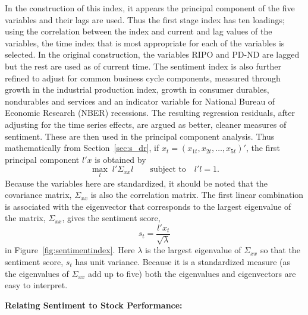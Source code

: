 In the construction of this index, it appears the principal component of the five variables and their lags are used. Thus the first stage index has ten loadings; using the correlation between the index and current and lag values of the variables, the time index that is most appropriate for each of the variables is selected. In the original construction, the variables RIPO and PD-ND are lagged but the rest are used as of current time. The sentiment index is also further refined to adjust for common business cycle components, measured through growth in the industrial production index, growth in consumer durables, nondurables and services and an indicator variable for National Bureau of Economic Research (NBER) recessions. The resulting regression residuals, after adjusting for the time series effects, are argued as better, cleaner measures of sentiment. These are then used in the principal component analysis. Thus mathematically from Section~\ref{sec:s_dr}, if $x_t= (x_{1t}, x_{2t}, \ldots, x_{5t})'$, the first principal component $l'x$ is obtained by
	\begin{equation}
	\max_l \; l' \textstyle \Sigma_{xx} l \qquad \text{subject to} \quad l'l=1.
	\end{equation}
Because the variables here are standardized, it should be noted that the covariance matrix, $\Sigma_{xx}$ is also the correlation matrix. The first linear combination is associated with the eigenvector that corresponds to the largest eigenvalue of the matrix, $\Sigma_{xx}$, gives the sentiment score,
	\begin{equation} \label{eq:stsqlambda}
	s_t= \dfrac{l' x_t}{\sqrt{\lambda}}
	\end{equation}
in Figure~\ref{fig:sentimentindex}. Here $\lambda$ is the largest eigenvalue of $\Sigma_{xx}$ so that the sentiment score, $s_t$ has unit variance. Because it is a standardized measure (as the eigenvalues of $\Sigma_{xx}$ add up to five) both the eigenvalues and eigenvectors are easy to interpret. \twomedskip


\noindent\textbf{Relating Sentiment to Stock Performance:} \twomedskip


